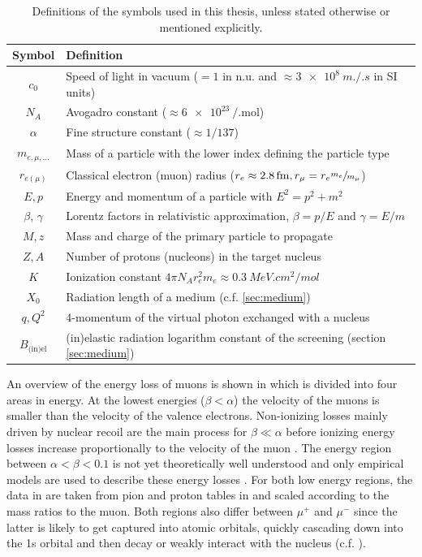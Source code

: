 \begin{table}
    \centering
    \caption{Definitions of the symbols used in this thesis, unless stated otherwise or mentioned explicitly.}
    \label{tab:symbols}
    \begin{tabular}{cl}
        \toprule
        Symbol & Definition \\
        \midrule
        $c_0$ & Speed of light in vacuum ($=1$ in n.u. and $\approx \SI{3e8}{m.\per.s}$ in SI units) \\
        $N_A$ & Avogadro constant ($\approx \SI{6e23}{\per.\mol}$) \\
        $\alpha$ & Fine structure constant ($\approx 1/137$) \\
        $m_{e,\mu,\dots}$ & Mass of a particle with the lower index defining the particle type \\
        $r_{e (\mu)}$ & Classical electron (muon) radius ($r_e\approx \SI{2.8}{fm}, r_\mu = r_e \sfrac{m_e}{m_\mu}$) \\
        $E, p$ & Energy and momentum of a particle with $E^2 = p^2 + m^2$\\
        $\beta$, $\gamma$ & Lorentz factors in relativistic approximation, $\beta = p/E$ and  $\gamma = E/m$ \\
        $M, z$ & Mass and charge of the primary particle to propagate \\
        $Z, A$ & Number of protons (nucleons) in the target nucleus \\
        $K$ & Ionization constant $4\pi N_A r_e^2 m_e \approx \SI{0.3}{MeV.cm^2 / mol}$ \\
        $X_0$ & Radiation length of a medium (c.f. \ref{sec:medium}) \\
        $q, Q^2$ & 4-momentum of the virtual photon exchanged with a nucleus \\
        $B_{\text{(in)el}}$ & (in)elastic radiation logarithm constant of the screening (section \ref{sec:medium}) \\
        \bottomrule
    \end{tabular}
\end{table}

An overview of the energy loss of muons is shown in  which is divided into four areas in energy.
At the lowest energies ($\beta < \alpha$) the velocity of the muons is smaller than the velocity of the valence electrons.
Non-ionizing losses mainly driven by nuclear recoil are the main process for $\beta \ll \alpha$ before ionizing energy losses increase proportionally to the velocity of the muon \cite{Groom01}.
The energy region between $\alpha < \beta < \num{0.1}$ is not yet theoretically well understood and only empirical models are used to describe these energy losses \cite{Groom01}.
For both low energy regions, the data in  are taken from pion and proton tables in \cite{ICRU49} and scaled according to the mass ratios to the muon.
Both regions also differ between $\mu^+$ and $\mu^-$ since the latter is likely to get captured into atomic orbitals, quickly cascading down into the 1s orbital and then decay or weakly interact with the nucleus (c.f. \cite{Measday01}).

